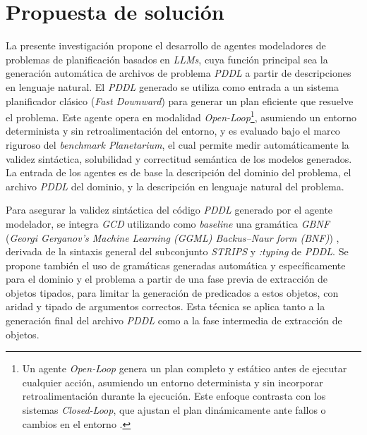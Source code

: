 \section*{Propuesta de solución}

La presente investigación propone el desarrollo de agentes modeladores de problemas de planificación basados en \textit{LLMs}, cuya función principal sea la generación automática de archivos de problema \textit{PDDL} a partir de descripciones en lenguaje natural. El \textit{PDDL} generado se utiliza como entrada a un sistema planificador clásico (\textit{Fast Downward}) para generar un plan eficiente que resuelve el problema. Este agente opera en modalidad \textit{Open-Loop}\footnote{Un agente \textit{Open-Loop} genera un plan completo y estático antes de ejecutar cualquier acción, asumiendo un entorno determinista y sin incorporar retroalimentación durante la ejecución. Este enfoque contrasta con los sistemas \textit{Closed-Loop}, que ajustan el plan dinámicamente ante fallos o cambios en el entorno \parencite{wei2025plangenllms}.}, asumiendo un entorno determinista y sin retroalimentación del entorno, y es evaluado bajo el marco riguroso del \textit{benchmark Planetarium}, el cual permite medir automáticamente la validez sintáctica, solubilidad y correctitud semántica de los modelos generados. La entrada de los agentes es de base la descripción del dominio del problema, el archivo \textit{PDDL} del dominio, y la descripción en lenguaje natural del problema.

Para asegurar la validez sintáctica del código \textit{PDDL} generado por el agente modelador, se integra \textit{GCD} utilizando como \textit{baseline} una gramática \textit{GBNF} (\textit{Georgi Gerganov's Machine Learning (GGML) Backus--Naur form (BNF)}) \parencite{ggml2023gbnf}, derivada de la sintaxis general del subconjunto \textit{STRIPS} y \textit{:typing} de \textit{PDDL}. Se propone también el uso de gramáticas generadas automática y específicamente para el dominio y el problema a partir de una fase previa de extracción de objetos tipados, para limitar la generación de predicados a estos objetos, con aridad y tipado de argumentos correctos. Esta técnica se aplica tanto a la generación final del archivo \textit{PDDL} como a la fase intermedia de extracción de objetos.


